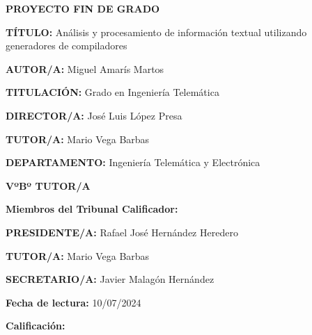 \vspace{8,5cm}
\begin{center}
	{\fontsize{20}{24} \textbf{PROYECTO FIN DE GRADO} } \\
	
\end{center}
\vspace{1,3cm}
\begin{adjustwidth}{3cm}{4cm}
	{\setlength{\parskip}{0pt} \setlength{\parindent}{0pt}


{\fontsize{11}{13,2}
	{\textbf{TÍTULO:}  Análisis y procesamiento de información textual utilizando
		generadores de compiladores }\vspace{19pt}
	
	
	{\textbf{AUTOR/A:} Miguel Amarís Martos}\vspace{19pt}
	
	{\textbf{TITULACIÓN:} Grado en Ingeniería Telemática}\vspace{19pt}
	
	{\textbf{DIRECTOR/A:} José Luis López Presa} \vspace{19pt}
	
	{\textbf{TUTOR/A:} Mario Vega Barbas} \vspace{19pt}
	
	{\textbf{DEPARTAMENTO:} Ingeniería Telemática y Electrónica}\vspace{19pt}
	
	\hspace*{\fill}	{\textbf{VºBº TUTOR/A}  }\vspace{17pt}
	
	{\textbf{Miembros del Tribunal Calificador:}}\vspace{19pt}
	
	{\textbf{PRESIDENTE/A:} Rafael José Hernández Heredero}\vspace{19pt}
	
	{\textbf{TUTOR/A:} Mario Vega Barbas}\vspace{19pt}
	
	{\textbf{SECRETARIO/A:} Javier Malagón Hernández}\vspace{19pt}
	
	{\textbf{Fecha de lectura:} 10/07/2024}\vspace{19pt}
	
	{\textbf{Calificación:} }\vspace{19pt}
	
	\vspace{19pt}
}
}
\end{adjustwidth}

\restoregeometry